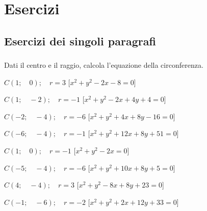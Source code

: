 
\section{Esercizi}

\subsection{Esercizi dei singoli paragrafi}

\subsubsection*{}
\begin{esercizio}\label{ese:}
 Dati il centro e il raggio, calcola l'equazione della circonferenza.
 \begin{enumeratea}
  \item  \(C \left (1; \quad 0 \right ); \quad r = 3\)
   \hfill [\(x^2 + y^2 -2x -8 = 0\)]
  \item  \(C \left (1; \quad -2 \right ); \quad r = -1\)
   \hfill [\(x^2 + y^2 -2x +4y +4 = 0\)]
  \item  \(C \left (-2; \quad -4 \right ); \quad r = -6\)
   \hfill [\(x^2 + y^2 +4x +8y -16 = 0\)]
  \item  \(C \left (-6; \quad -4 \right ); \quad r = -1\)
   \hfill [\(x^2 + y^2 +12x +8y +51 = 0\)]
  \item  \(C \left (1; \quad 0 \right ); \quad r = -1\)
   \hfill [\(x^2 + y^2 -2x  = 0\)]
  \item  \(C \left (-5; \quad -4 \right ); \quad r = -6\)
   \hfill [\(x^2 + y^2 +10x +8y +5 = 0\)]
  \item  \(C \left (4; \quad -4 \right ); \quad r = 3\)
   \hfill [\(x^2 + y^2 -8x +8y +23 = 0\)]
  \item  \(C \left (-1; \quad -6 \right ); \quad r = -2\)
   \hfill [\(x^2 + y^2 +2x +12y +33 = 0\)]
 \end{enumeratea}
\end{esercizio}


